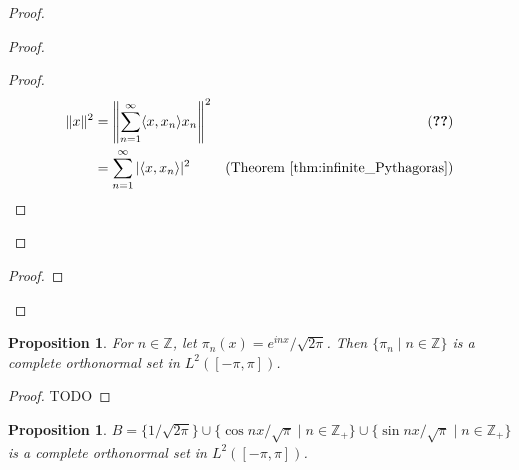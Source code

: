 \documentclass{book}
\let\qed\relax
\newtheorem{prop}[ax]{Proposition}
\theoremstyle{definition}
\begin{document}
\begin{proof}
\pf
{}
\begin{proof}
	\begin{proof}
		\pf
		\begin{align*}
			\|x\|^2 & = \left\| \sum_{n=1}^\infty \langle x, x_n \rangle x_n \right\|^2 & (\text{\stepref{a}}) \\
			& = \sum_{n=1}^\infty |\langle x, x_n \rangle|^2 & (\text{Theorem \ref{thm:infinite_Pythagoras}})
		\end{align*}
	\end{proof}
\end{proof}
\begin{proof}
\end{proof}
\qed
\end{proof}

\begin{prop}
\label{prop:Example3_4_16}
For $n \in \mathbb{Z}$, let $\pi_n(x) = e^{inx}/\sqrt{2 \pi}$. Then $\{ \pi_n \mid n \in \mathbb{Z} \}$ is a complete orthonormal set in $L^2([-\pi,\pi])$.
\end{prop}

\begin{proof}
TODO
\end{proof}

\begin{prop}
$B = \{ 1/\sqrt{2 \pi} \} \cup \{ \cos nx / \sqrt{\pi} \mid n \in \mathbb{Z}_+ \} \cup \{ \sin n x / \sqrt{\pi} \mid n \in \mathbb{Z}_+ \}$ is a complete orthonormal set in $L^2([-\pi, \pi])$.
\end{prop}
\end{document}
